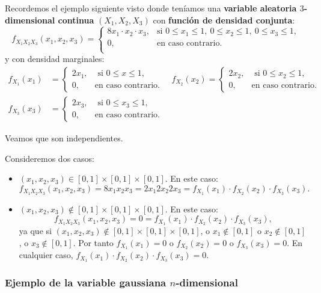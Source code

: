 \documentclass[]{book}
\begin{document}
Recordemos el ejemplo siguiente visto donde teníamos una \textbf{variable aleatoria \(3\)-dimensional continua} \((X_1,X_2,X_3)\) con \textbf{función de densidad conjunta}:
\[
f_{X_1X_2X_3}(x_1,x_2,x_3)=\begin{cases}
8 x_1\cdot x_2\cdot x_3, & \mbox{si }0\leq x_1\leq 1,\ 0\leq x_2\leq 1,\ 0\leq x_3\leq 1, \\
0, & \mbox{en caso contrario.}\\
\end{cases}
\]
y con densidad marginales:
\[
\begin{array}{rl}
f_{X_1}(x_1) & =\begin{cases}
2x_1, & \mbox{ si }0\leq x\leq 1,\\
0, & \mbox{en caso contrario.}
\end{cases}\quad f_{X_2}(x_2)=\begin{cases}
2x_2, & \mbox{ si }0\leq x_2\leq 1,\\
0, & \mbox{en caso contrario.}
\end{cases}\\ f_{X_3}(x_3) & =\begin{cases}
2x_3, & \mbox{ si }0\leq x_3\leq 1,\\
0, & \mbox{en caso contrario.}
\end{cases}
\end{array}
\]

Veamos que son independientes.

Consideremos dos casos:

\begin{itemize}
\item
  \((x_1,x_2,x_3)\in [0,1]\times [0,1]\times [0,1]\). En este caso:
  \[
  f_{X_1X_2X_3}(x_1,x_2,x_3) =8 x_1 x_2 x_3 =2 x_1 2 x_2 2 x_3=f_{X_1}(x_1)\cdot f_{X_2}(x_2)\cdot f_{X_3}(x_3).
  \]
\item
  \((x_1,x_2,x_3)\not\in [0,1]\times [0,1]\times [0,1]\). En este caso:
  \[
  f_{X_1X_2X_3}(x_1,x_2,x_3)  =0 = f_{X_1}(x_1)\cdot f_{X_2}(x_2)\cdot f_{X_3}(x_3),
  \]
  ya que si \((x_1,x_2,x_3)\not\in [0,1]\times [0,1]\times [0,1]\), o \(x_1\not\in [0,1]\) o \(x_2\not\in [0,1]\), o \(x_3\not\in [0,1]\). Por tanto \(f_{X_1}(x_1)=0\) o \(f_{X_2}(x_2)=0\) o \(f_{X_3}(x_3)=0\). En cualquier caso, \(f_{X_1}(x_1)\cdot f_{X_2}(x_2)\cdot f_{X_3}(x_3)=0\).
\end{itemize}

\hypertarget{ejemplo-de-la-variable-gaussiana-n-dimensional}{%
\subsubsection{\texorpdfstring{Ejemplo de la variable gaussiana \(n\)-dimensional}{Ejemplo de la variable gaussiana n-dimensional}}\label{ejemplo-de-la-variable-gaussiana-n-dimensional}}
\end{document}
